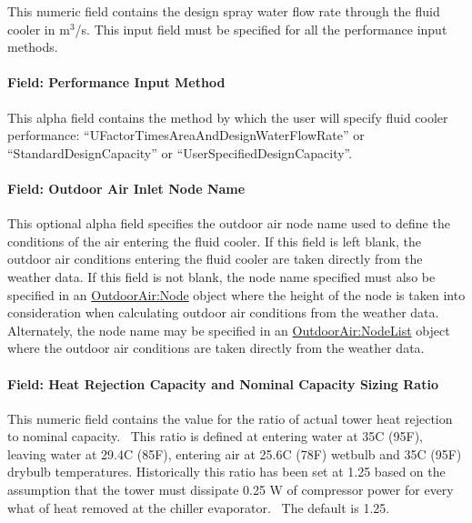 This numeric field contains the design spray water flow rate through the fluid cooler in m\(^{3}\)/s. This input field must be specified for all the performance input methods.

\paragraph{Field: Performance Input Method}\label{field-performance-input-method-4}

This alpha field contains the method by which the user will specify fluid cooler performance: ``UFactorTimesAreaAndDesignWaterFlowRate'' or ``StandardDesignCapacity'' or ``UserSpecifiedDesignCapacity''.

\paragraph{Field: Outdoor Air Inlet Node Name}\label{field-outdoor-air-inlet-node-name-5}

This optional alpha field specifies the outdoor air node name used to define the conditions of the air entering the fluid cooler. If this field is left blank, the outdoor air conditions entering the fluid cooler are taken directly from the weather data. If this field is not blank, the node name specified must also be specified in an \hyperref[outdoorairnode]{OutdoorAir:Node} object where the height of the node is taken into consideration when calculating outdoor air conditions from the weather data. Alternately, the node name may be specified in an \hyperref[outdoorairnodelist]{OutdoorAir:NodeList} object where the outdoor air conditions are taken directly from the weather data.

\paragraph{Field: Heat Rejection Capacity and Nominal Capacity Sizing Ratio}\label{field-heat-rejection-capacity-and-nominal-capacity-sizing-ratio-4}

This numeric field contains the value for the ratio of actual tower heat rejection to nominal capacity.~ This ratio is defined at entering water at 35C (95F), leaving water at 29.4C (85F), entering air at 25.6C (78F) wetbulb and 35C (95F) drybulb temperatures. Historically this ratio has been set at 1.25 based on the assumption that the tower must dissipate 0.25 W of compressor power for every what of heat removed at the chiller evaporator.~ The default is 1.25.

